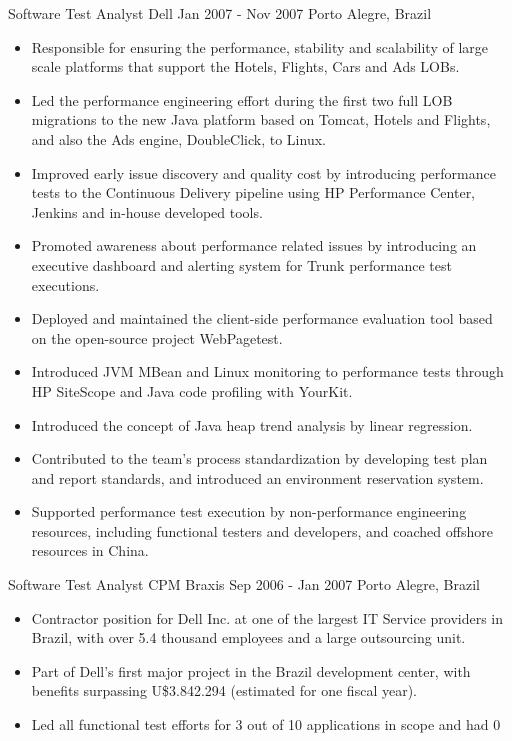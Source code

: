 \documentclass[]{mspier-cv}
\begin{document}
\experienceitem
  {Software Test Analyst}
  {Dell}
  {Jan 2007 - Nov 2007}
  {Porto Alegre, Brazil}
  {
  \begin{itemize}
    \item Responsible for ensuring the performance, stability and scalability of large scale platforms that support the Hotels, Flights, Cars and Ads LOBs.
    \item Led the performance engineering effort during the first two full LOB migrations to the new Java platform based on Tomcat, Hotels and Flights, and also the Ads engine, DoubleClick, to Linux.
    \item Improved early issue discovery and quality cost by introducing performance tests to the Continuous Delivery pipeline using HP Performance Center, Jenkins and in-house developed tools.
    \item Promoted awareness about performance related issues by introducing an executive dashboard and alerting system for Trunk performance test executions.
    \item Deployed and maintained the client-side performance evaluation tool based on the open-source project WebPagetest.
    \item Introduced JVM MBean and Linux monitoring to performance tests through HP SiteScope and Java code profiling with YourKit.
    \item Introduced the concept of Java heap trend analysis by linear regression.
    \item Contributed to the team’s process standardization by developing test plan and report standards, and introduced an environment reservation system.
    \item Supported performance test execution by non-performance engineering resources, including functional testers and developers, and coached offshore resources in China.
  \end{itemize}
  }

\experienceitem
  {Software Test Analyst}
  {CPM Braxis}
  {Sep 2006 - Jan 2007}
  {Porto Alegre, Brazil}
  {
  \begin{itemize}
    \item Contractor position for Dell Inc. at one of the largest IT Service providers in Brazil, with over 5.4 thousand employees and a large outsourcing unit.
    \item Part of Dell’s first major project in the Brazil development center, with benefits surpassing U\$3.842.294 (estimated for one fiscal year).
    \item Led all functional test efforts for 3 out of 10 applications in scope and had 0%
  \end{itemize}
  }
\end{document}
